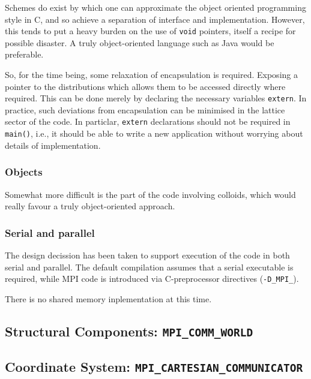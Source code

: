 Schemes do exist by which one can approximate the object
oriented programming style in C, and so achieve a separation
of interface and implementation. However, this tends to put
a heavy burden on the use of \texttt{void} pointers, itself
a recipe for possible disaster. A truly object-oriented
language such as Java would be preferable.

So, for the time being, some relaxation of encapsulation is required.
Exposing a pointer to the distributions which allows them to be accessed
directly where required. This can be done merely by declaring the
necessary variables \texttt{extern}. In practice, such deviations
from encapsulation can be minimised in the lattice sector of the
code. In particlar, \texttt{extern} declarations should not be
required in \texttt{main()}, i.e., it should be able to write a
new application without worrying about details of implementation.

\subsubsection{Objects}

Somewhat more difficult is the part of the code involving
colloids, which would really favour a truly object-oriented
approach.

\subsubsection{Serial and parallel}

The design decission has been taken to support execution of the
code in both serial and parallel. The default compilation
assumes that a serial executable is required, while  MPI code
is introduced via C-preprocessor directives (\texttt{-D\_MPI\_}).


There is no shared memory inplementation at this time.


\subsection{Structural Components: \texttt{MPI\_COMM\_WORLD}}


\subsection{Coordinate System: \texttt{MPI\_CARTESIAN\_COMMUNICATOR}}


